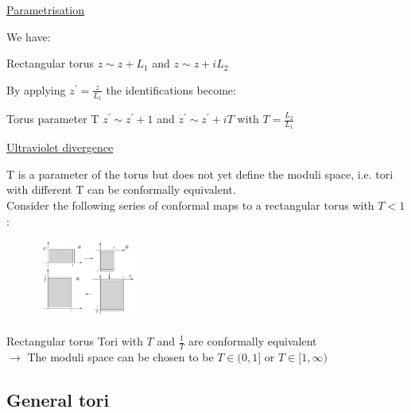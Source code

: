 \documentclass[11pt,aspectratio=169]{beamer}
\begin{document}
\begin{frame}{\underline{Parametrisation}}

	We have:
	\\
	\begin{block}{Rectangular torus}
		$z \sim z + L_1$ and $z \sim z + iL_2$
	\end{block}
	\bigskip
	By applying $z^{'} = \frac{z}{L_1}$ the identifications become:
	\begin{block}{Torus parameter T}
		$z^{'} \sim z^{'} + 1$ and $z^{'} \sim z^{'} + iT$ with $T = \frac{L_2}{L_1}$
	\end{block}

\end{frame}

\begin{frame}{\underline{Ultraviolet divergence}}

	T is a parameter of the torus but does not yet define the moduli space, i.e. tori with different T can be conformally equivalent.
	\\
	Consider the following series of conformal maps to a rectangular torus with $T<1$:

	\begin{figure}[htbp]
		\centering
		\includegraphics[width = 0.30\textwidth]{elements/three maps.PNG}
	\end{figure}
	\begin{block}{Rectangular torus}
		Tori with $T$ and $\frac{1}{T}$ are conformally equivalent
		\\
		$\rightarrow$ The moduli space can be chosen to be $T \in (0,1]$ or $T \in [1, \infty)$
	\end{block}
	
\end{frame}

\subsection{General tori}
\end{document}
